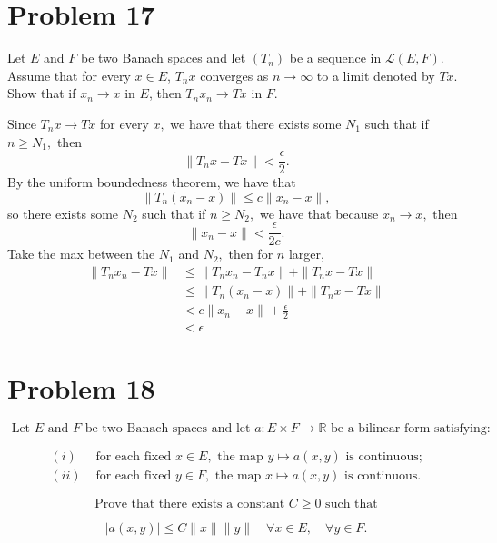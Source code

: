 \documentclass[11pt]{article}
\begin{document}
\section*{Problem 17}
\begin{problem}
Let \( E \) and \( F \) be two Banach spaces and let \( (T_n) \) be a sequence in \( \mathcal{L}(E, F) \).  
Assume that for every \( x \in E \), \( T_nx \) converges as \( n \to \infty \) to a limit denoted by \( Tx \).  
Show that if \( x_n \to x \) in \( E \), then \( T_nx_n \to Tx \) in \( F \).
\end{problem}
\begin{solution}
Since $T_nx \to Tx$ for every $x,$ we have that there exists some $N_1 $ such that if $n\geq N_1,$ then 
\[\|T_nx - Tx\|< \frac{\epsilon}{2}.\]
By the uniform boundedness theorem, we have that 
\[\|T_n(x_n - x)\|\leq c\|x_n - x\|,\] so there exists some $N_2$ such that if $n\geq N_2,$ we have that because $x_n \to x,$ then 
\[\|x_n - x\| < \frac{\epsilon}{2c}.\] Take the max between the $N_1$ and $N_2,$ then for $n$ larger,
    \begin{align*}
        \|T_nx_n - Tx\| &\leq \|T_nx_n - T_n x\| + \|T_nx -Tx\|\\
        &\leq \|T_n(x_n - x)\| + \|T_nx - Tx\|\\
        &< c\|x_n - x\| + \frac{\epsilon}{2}\\
        &< \epsilon
    \end{align*}
\end{solution}




\newpage
\section*{Problem 18}
\begin{problem}


\[
\text{ Let } E \text{ and } F \text{ be two Banach spaces and let } a : E \times F \rightarrow \mathbb{R} \text{ be a bilinear form satisfying:}
\]




\[
\begin{aligned}
(i) & \text{ for each fixed } x \in E, \text{ the map } y \mapsto a(x, y) \text{ is continuous;} \\
(ii) & \text{ for each fixed } y \in F, \text{ the map } x \mapsto a(x, y) \text{ is continuous.}
\end{aligned}
\]




\[
\text{Prove that there exists a constant } C \geq 0 \text{ such that}
\]




\[
|a(x, y)| \leq C \|x\| \|y\| \quad \forall x \in E, \quad \forall y \in F.
\]


   
\end{problem}
\end{document}
